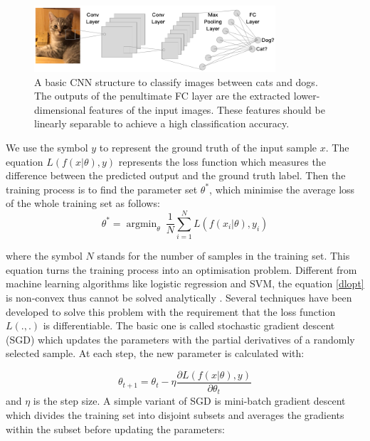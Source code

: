  \begin{figure}[H]
 \centering
 \includegraphics[width=0.8\textwidth]{src/CNN.png}
 \caption{A basic CNN structure to classify images between cats and dogs. The outputs of the penultimate FC layer are the extracted lower-dimensional features of the input images. These features should be linearly separable to achieve a high classification accuracy.}
 \label{Fig.CNN}
 \end{figure}



We use the symbol $y$ to represent the ground truth of the input sample $x$. The equation $L(f(x|\theta), y)$ represents the loss function which measures the difference between the predicted output and the ground truth label. Then the training process is to find the parameter set $\theta^*$, which minimise the average loss of the whole training set as follows:
\begin{equation}
\label{dlopt}
\theta^* = \mathop{\arg\min}_{\theta}\ \frac{1}{N}\sum^{N}_{i=1}L(f(x_i|\theta), y_i)
\end{equation}

where the symbol $N$ stands for the number of samples in the training set. This equation turns the training process into an optimisation problem. Different from machine learning algorithms like logistic regression and SVM, the equation \ref{dlopt} is non-convex thus cannot be solved analytically \cite[p.~304]{Courville2016}. Several techniques have been developed to solve this problem with the requirement that the loss function $L(.,.)$ is differentiable. The basic one is called stochastic gradient descent (SGD) which updates the parameters with the partial derivatives of a randomly selected sample. At each step, the new parameter is calculated with: 

\begin{equation}
	\theta_{t+1} = \theta_t - \eta
 \frac{\partial{L(f(x|\theta), y)}}{\partial{\theta_t}}
\end{equation}
and $\eta$ is the step size. A simple variant of SGD is mini-batch gradient descent which divides the training set into disjoint subsets and averages the gradients within the subset before updating the parameters:

